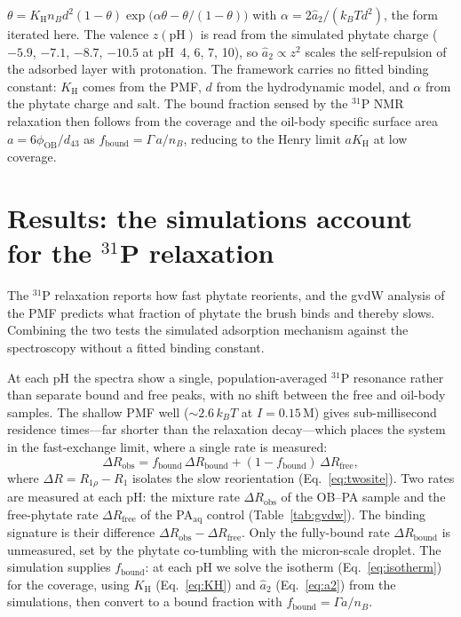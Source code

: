 \documentclass[11pt]{article}
\begin{document}
$\theta = K_\text{H}n_B d^2(1-\theta)\exp\!\big(\alpha\theta-\theta/(1-\theta)\big)$
with $\alpha = 2\hat a_2/(k_BT d^2)$, the form iterated here.  The valence
$z(\text{pH})$ is read from the
simulated phytate charge ($-5.9$, $-7.1$, $-8.7$, $-10.5$ at pH~4, 6, 7, 10), so
$\hat a_2\propto z^2$ scales the self-repulsion of the adsorbed layer with
protonation.  The framework carries
no fitted binding constant: $K_\text{H}$ comes from the PMF, $d$ from the
hydrodynamic model, and $\alpha$ from the phytate charge and salt.  The bound
fraction sensed by the $^{31}$P NMR relaxation then follows from the coverage
and the oil-body specific surface area $a=6\phi_\text{OB}/d_{43}$ as
$f_\text{bound} = \Gamma\,a/n_B$, reducing to the Henry limit $a K_\text{H}$ at
low coverage.

\section{Results: the simulations account for the \texorpdfstring{$^{31}$P}{31P} relaxation}

The $^{31}$P relaxation reports how fast phytate reorients, and the gvdW
analysis of the PMF predicts what fraction of phytate the brush binds and
thereby slows.  Combining the two tests the simulated adsorption mechanism
against the spectroscopy without a fitted binding constant.

At each pH the spectra show a single, population-averaged $^{31}$P resonance
rather than separate bound and free peaks, with no shift between the free and
oil-body samples.  The shallow PMF well ($\sim2.6\,k_BT$ at $I=0.15$\,M) gives
sub-millisecond residence times---far shorter than the relaxation decay---which
places the system in the fast-exchange limit, where a single rate is measured:
\begin{equation}\label{eq:twosite}
\Delta R_\text{obs} = f_\text{bound}\,\Delta R_\text{bound}
                    + (1-f_\text{bound})\,\Delta R_\text{free},
\end{equation}
where $\Delta R = R_{1\rho}-R_1$ isolates the slow reorientation
(Eq.~\ref{eq:twosite}).  Two rates are measured at each pH: the mixture rate
$\Delta R_\text{obs}$ of the OB--PA sample and the free-phytate rate
$\Delta R_\text{free}$ of the PA$_\text{aq}$ control (Table~\ref{tab:gvdw}).
The binding signature is their difference
$\Delta R_\text{obs}-\Delta R_\text{free}$.  Only the fully-bound rate
$\Delta R_\text{bound}$ is unmeasured, set by the phytate co-tumbling with the
micron-scale droplet.  The simulation supplies $f_\text{bound}$: at each pH we
solve the isotherm (Eq.~\ref{eq:isotherm}) for the coverage, using $K_\text{H}$
(Eq.~\ref{eq:KH}) and $\hat a_2$ (Eq.~\ref{eq:a2}) from the simulations, then
convert to a bound fraction with $f_\text{bound}=\Gamma a/n_B$.
\end{document}

